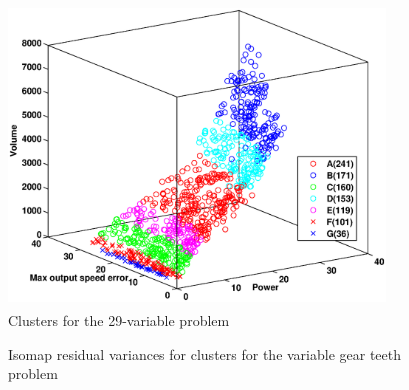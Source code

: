 \begin{figure}[ht]\begin{center}
 \includegraphics[width=100mm, height=80mm]{dia/gtvopareto2.eps}
 \caption{Clusters for the 29-variable problem}
 \label{gtvClusters}
\end{center}\end{figure}


\begin{figure}[ht]\begin{center}
 \caption{Isomap residual variances for clusters for the variable gear teeth problem}
 \label{gtvClustersRV}
\end{center}\end{figure}

